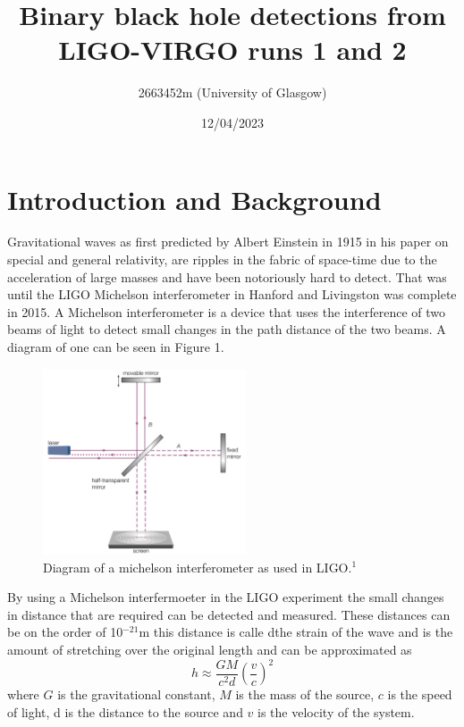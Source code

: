 \documentclass[]{article}
\title{\textbf{Binary black hole detections from LIGO-VIRGO runs 1 and 2}}
\author{2663452m (University of Glasgow)}
\date{12/04/2023}
\begin{document}
\maketitle

\begin{abstract}

\end{abstract}
\twocolumn
\newpage





\section*{Introduction and Background}
Gravitational waves as first predicted by Albert Einstein in 1915 in his paper on
special and general relativity, are ripples in the fabric of space-time due to the acceleration of large masses
and have been notoriously hard to detect. That was until
the LIGO Michelson interferometer in Hanford and Livingston was complete in 2015.
A Michelson interferometer is a device that uses the interference of two beams of
light to detect small changes in the path distance of the two beams. A diagram of one can
be seen in Figure 1.
\begin{figure}[h]
    \includegraphics[width=6cm]{images/michelson_interferometer.png}
    \caption{Diagram of a michelson interferometer as used in LIGO.$^1$}
    \label{fig:michelson}
    \end{figure}
By using a Michelson interfermoeter in the LIGO experiment the small changes in
distance that are required can be detected and measured. These distances can be on the
order of 10$^{-21}$m this distance is calle dthe strain of the wave and
is the amount of stretching over the original length and can be approximated as
\begin{equation}h \approx \frac{GM}{c^2d}\left(\frac{v}{c}\right)^2 \label{eq:strain}\end{equation}
where $G$ is the gravitational constant, $M$ is the mass of the source, $c$ is the speed of light,
d is the distance to the source and $v$ is the velocity of the system.
\end{document}
